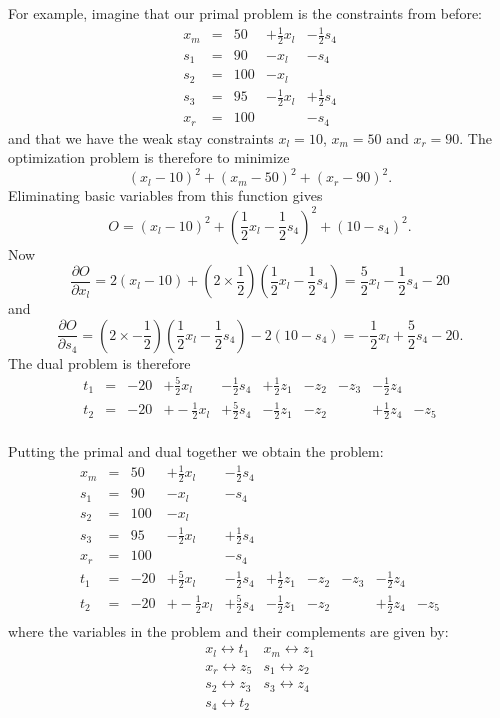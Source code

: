 \documentclass{article}
\begin{document}
For example, imagine that our primal problem is the constraints from before:
\[
\begin{array}{rlrrr}
x_m & = &50 & + \frac{1}{2} x_l & - \frac{1}{2} s_4 \\
s_1 & = &90 & - x_l &  - s_4 \\
s_2 & = &100 & - x_l \\
s_3 & = &95 & - \frac{1}{2} x_l & + \frac{1}{2} s_4 \\
x_r & = &100 &  & - s_4
\end{array}
\]
and that we have the weak stay
constraints  $x_l = 10$, $x_m= 50$ and $x_r = 90$.
The optimization problem is therefore to minimize
\[
(x_l - 10)^2 + (x_m - 50)^2 + (x_r - 90)^2.
\]
Eliminating basic variables from this function gives
\[
O = (x_l - 10)^2 + (\frac{1}{2} x_l  - \frac{1}{2} s_4)^2
 + (10 -s_4)^2.
\]
Now
\[
\frac{ \partial O}{\partial x_l} = 2 (x_l - 10) +
 (2 \times \frac{1}{2}) (\frac{1}{2} x_l  - \frac{1}{2} s_4)
= \frac{5}{2} x_l  - \frac{1}{2} s_4 - 20
\]
and
\[
\frac{ \partial O}{\partial s_4} =
 (2 \times - \frac{1}{2}) (\frac{1}{2} x_l  - \frac{1}{2} s_4)
 - 2 (10 -s_4)
= - \frac{1}{2} x_l  + \frac{5}{2} s_4 - 20.
\]
The dual problem is therefore
\[
\begin{array}{rlrrrrrrrr}
t_1 & = &-20 & + \frac{5}{2} x_l & - \frac{1}{2} s_4 &
        + \frac{1}{2} z_1 & - z_2 & - z_3 & - \frac{1}{2} z_4 & \\
t_2 & = &-20 & + - \frac{1}{2} x_l & + \frac{5}{2} s_4 &
        - \frac{1}{2} z_1 & - z_2 &  & + \frac{1}{2} z_4 & -z_5  \\
\end{array}
\]

Putting the primal and dual together we obtain the problem:
\[
\begin{array}{rlrrrrrrrr}
x_m & = &50 & + \frac{1}{2} x_l & - \frac{1}{2} s_4 \\
s_1 & = &90 & - x_l &  - s_4 \\
s_2 & = &100 & - x_l \\
s_3 & = &95 & - \frac{1}{2} x_l & + \frac{1}{2} s_4 \\
x_r & = &100 &  & - s_4\\
t_1 & = &-20 & + \frac{5}{2} x_l & - \frac{1}{2} s_4 &
        + \frac{1}{2} z_1 & - z_2 & - z_3 & - \frac{1}{2} z_4 & \\
t_2 & = &-20 & + - \frac{1}{2} x_l & + \frac{5}{2} s_4 &
        - \frac{1}{2} z_1 & - z_2 &  & + \frac{1}{2} z_4 & -z_5  \\
\end{array}
\]
where the variables in the problem and their complements are given by:
\[
\begin{array}{cc}
x_l \leftrightarrow t_1 & x_m \leftrightarrow z_1 \\
x_r \leftrightarrow z_5 & s_1 \leftrightarrow z_2 \\
s_2 \leftrightarrow z_3 & s_3 \leftrightarrow z_4 \\
s_4 \leftrightarrow t_2 &  \\
\end{array}
\]
\end{document}
